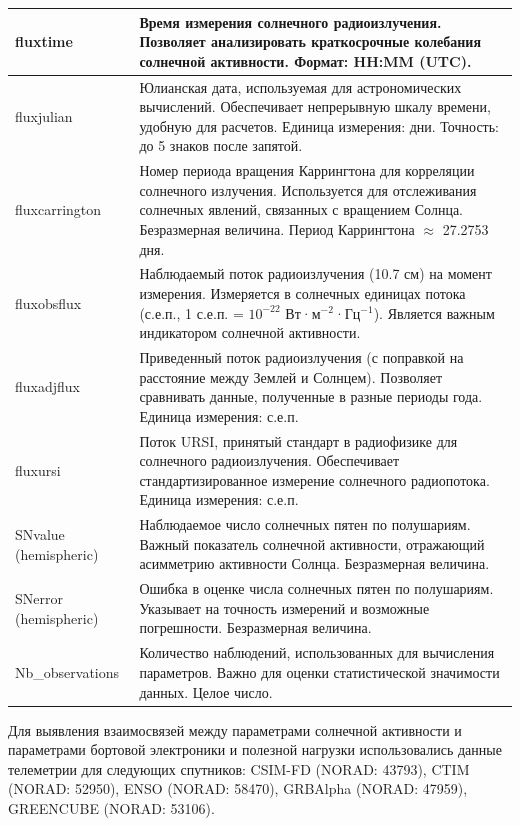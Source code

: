 \documentclass[14pt, a4paper]{bsu}
\begin{document}
\begin{longtable}{|l|p{12cm}|}
	\\ \hline fluxtime              & Время измерения солнечного
	радиоизлучения. Позволяет анализировать краткосрочные колебания
	солнечной активности. Формат: HH:MM (UTC).
	\\ \hline fluxjulian            & Юлианская дата, используемая для
	астрономических вычислений. Обеспечивает непрерывную шкалу времени,
	удобную для расчетов. Единица измерения: дни. Точность: до 5 знаков
	после запятой.
	\\ \hline fluxcarrington        & Номер периода вращения
	Каррингтона для корреляции солнечного излучения. Используется для
	отслеживания солнечных явлений, связанных с вращением Солнца.
	Безразмерная величина. Период Каррингтона $\approx$ 27.2753 дня.
	\\ \hline fluxobsflux           & Наблюдаемый поток радиоизлучения
	(10.7 см) на момент измерения. Измеряется в солнечных единицах
	потока (с.е.п., 1 с.е.п. = \(10^{-22}\) Вт·м\(^{-2}\)·Гц\(^{-1}\)).
	Является важным индикатором солнечной активности.
	\\ \hline fluxadjflux           & Приведенный поток радиоизлучения
	(с поправкой на расстояние между Землей и Солнцем). Позволяет
	сравнивать данные, полученные в разные периоды года. Единица
	измерения: с.е.п.
	\\ \hline fluxursi              & Поток URSI, принятый стандарт в
	радиофизике для солнечного радиоизлучения. Обеспечивает
	стандартизированное измерение солнечного радиопотока. Единица
	измерения: с.е.п.
	\\ \hline SNvalue (hemispheric) & Наблюдаемое число солнечных пятен
	по полушариям. Важный показатель солнечной активности, отражающий
	асимметрию активности Солнца. Безразмерная величина.
	\\ \hline SNerror (hemispheric) & Ошибка в оценке числа солнечных
	пятен по полушариям. Указывает на точность измерений и возможные
	погрешности. Безразмерная величина.
	\\ \hline Nb\_observations      & Количество наблюдений,
	использованных для вычисления параметров. Важно для оценки
	статистической значимости данных. Целое число.
	\\\end{longtable}

Для выявления взаимосвязей между параметрами солнечной активности и
параметрами бортовой электроники и полезной нагрузки использовались
данные телеметрии для следующих спутников: CSIM-FD (NORAD: 43793),
CTIM (NORAD: 52950), ENSO (NORAD: 58470), GRBAlpha (NORAD: 47959),
GREENCUBE (NORAD: 53106).
\end{document}
